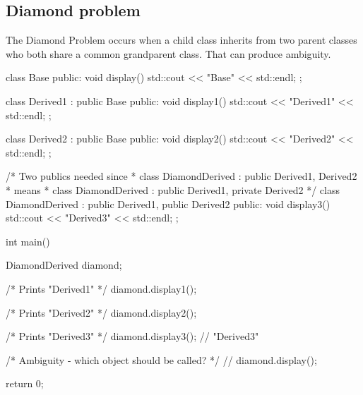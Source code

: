 \documentclass[../main]{subfiles}
\begin{document}
\subsection{Diamond problem}
    The Diamond Problem occurs when a child class inherits from two parent classes who both share a common grandparent class. That can produce ambiguity.
\begin{Code}
    class Base
    {
    public:
        void display() { std::cout << "Base" << std::endl; }
    };
    
    class Derived1 : public Base
    {
    public:
        void display1() { std::cout << "Derived1" << std::endl; }
    };
    
    class Derived2 : public Base
    {
    public:
        void display2() { std::cout << "Derived2" << std::endl; }
    };
    
    /* Two publics needed since
     *     class DiamondDerived : public Derived1, Derived2
     * means
     *     class DiamondDerived : public Derived1, private Derived2
     */
    class DiamondDerived : public Derived1, public Derived2
    {
    public:
        void display3() { std::cout << "Derived3" << std::endl; }
    };
    
    int main()
    {
        DiamondDerived diamond;

        /* Prints "Derived1" */
        diamond.display1();

        /* Prints "Derived2" */
        diamond.display2();

        /* Prints "Derived3" */
        diamond.display3(); // "Derived3"

        /* Ambiguity - which object should be called? */
        // diamond.display();
    
        return 0;
    }
    \end{Code}
\noindent
\end{document}
